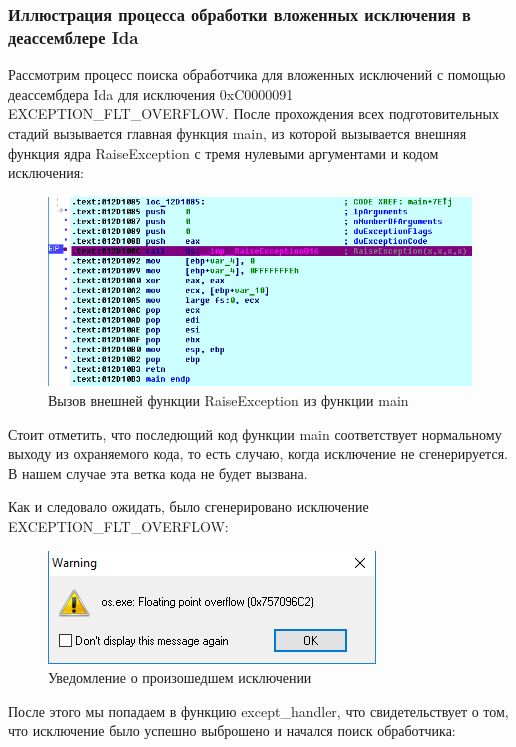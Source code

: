 \documentclass[14pt,a4paper,report]{report}
\begin{document}
\subsubsection{Иллюстрация процесса обработки вложенных исключения в деассемблере Ida}

Рассмотрим процесс поиска обработчика для вложенных исключений с помощью деассембдера Ida для исключения 0xC0000091 EXCEPTION\_FLT\_OVERFLOW. После прохождения всех подготовительных стадий вызывается главная функция main, из которой вызывается внешняя функция ядра RaiseException с тремя нулевыми аргументами и кодом исключения:

\begin{figure}[h!]
	\centering
	\includegraphics[scale = 0.75]{images/6_d1.png}
	\caption{Вызов внешней функции RaiseException из функции main}
\end{figure}

Стоит отметить, что последющий код функции main соответствует нормальному выходу из охраняемого кода, то есть случаю, когда исключение не сгенерируется. В нашем случае эта ветка кода не будет вызвана.

\clearpage

Как и следовало ожидать, было сгенерировано исключение EXCEPTION\_FLT\_OVERFLOW:

\begin{figure}[h!]
	\centering
	\includegraphics[scale = 0.75]{images/6_d2.png}
	\caption{Уведомление о произошедшем исключении}
\end{figure}

После этого мы попадаем в функцию except\_handler, что свидетельствует о том, что исключение было успешно выброшено и начался поиск обработчика:
\end{document}
